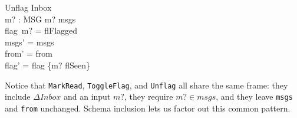 \documentclass{article}
\begin{document}
\begin{schema}{Unflag}
  \Delta Inbox \\
  m? : MSG
\where
  m? \in msgs \\
  flag~m? = flFlagged \\
  msgs' = msgs \\
  from' = from \\
  flag' = flag \oplus \{m? \mapsto flSeen\}
\end{schema}

Notice that \texttt{MarkRead}, \texttt{ToggleFlag}, and
\texttt{Unflag} all share the same frame: they include
$\Delta Inbox$ and an input $m?$, they require $m? \in msgs$,
and they leave \texttt{msgs} and \texttt{from} unchanged.
Schema inclusion lets us factor out this common pattern.
\end{document}

